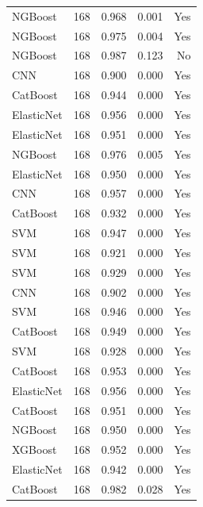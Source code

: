 \begin{table}
\begin{tabular}{lrrrr}
   NGBoost & 168 &        0.968 &     0.001 &                Yes \\
   NGBoost & 168 &        0.975 &     0.004 &                Yes \\
   NGBoost & 168 &        0.987 &     0.123 &                 No \\
       CNN & 168 &        0.900 &     0.000 &                Yes \\
  CatBoost & 168 &        0.944 &     0.000 &                Yes \\
ElasticNet & 168 &        0.956 &     0.000 &                Yes \\
ElasticNet & 168 &        0.951 &     0.000 &                Yes \\
   NGBoost & 168 &        0.976 &     0.005 &                Yes \\
ElasticNet & 168 &        0.950 &     0.000 &                Yes \\
       CNN & 168 &        0.957 &     0.000 &                Yes \\
  CatBoost & 168 &        0.932 &     0.000 &                Yes \\
       SVM & 168 &        0.947 &     0.000 &                Yes \\
       SVM & 168 &        0.921 &     0.000 &                Yes \\
       SVM & 168 &        0.929 &     0.000 &                Yes \\
       CNN & 168 &        0.902 &     0.000 &                Yes \\
       SVM & 168 &        0.946 &     0.000 &                Yes \\
  CatBoost & 168 &        0.949 &     0.000 &                Yes \\
       SVM & 168 &        0.928 &     0.000 &                Yes \\
  CatBoost & 168 &        0.953 &     0.000 &                Yes \\
ElasticNet & 168 &        0.956 &     0.000 &                Yes \\
  CatBoost & 168 &        0.951 &     0.000 &                Yes \\
   NGBoost & 168 &        0.950 &     0.000 &                Yes \\
   XGBoost & 168 &        0.952 &     0.000 &                Yes \\
ElasticNet & 168 &        0.942 &     0.000 &                Yes \\
  CatBoost & 168 &        0.982 &     0.028 &                Yes \\

\end{tabular}
\end{table}

